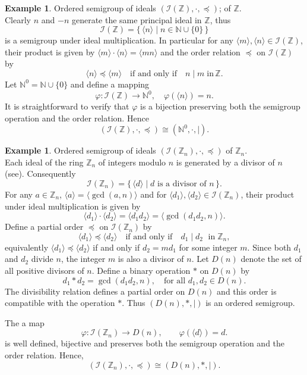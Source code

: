 \documentclass[12pt,a4paper]{amsart}
\theoremstyle{plain}
\theoremstyle{definition}
\newtheorem{example}[theorem]{Example}
\begin{document}
\begin{example} Ordered semigroup of ideals  $(\mathcal{I}(\mathbb{Z}), \cdot , \preccurlyeq)$; of $\mathbb{Z}$.\\
	Clearly $n$ and $-n$ generate the same principal ideal in $\mathbb{Z}$, thus 
	\[
	\mathcal{I}(\mathbb{Z}) = \{\, \langle n \rangle \mid n \in \mathbb{N} \cup \{0\} \,\}
	\]
	is a semigroup under ideal multiplication.
	In particular for any $\langle m \rangle, \langle n \rangle \in \mathcal{I}(\mathbb{Z})$,
	their product is given by
$	\langle m \rangle \cdot \langle n \rangle = \langle mn \rangle$
	and the order relation $\preccurlyeq$ on $\mathcal{I}(\mathbb{Z})$ by
	\[
	\langle n \rangle \preccurlyeq \langle m \rangle
	\quad \text{if and only if} \quad n \mid m \; \text{in}\, \mathbb{Z}.
	\]
	Let $\mathbb{N}^{0} = \mathbb{N} \cup \{0\}$ and define a mapping
	\[
	\varphi : \mathcal{I}(\mathbb{Z}) \longrightarrow \mathbb{N}^{0},
	\quad 	\varphi(\langle n \rangle) = n.
	\]
	It is straightforward to verify that $\varphi$ is a bijection preserving
	both the semigroup operation and the order relation.
	Hence
	\[
	(\mathcal{I}(\mathbb{Z}), \cdot , \preccurlyeq)
	\cong
	(\mathbb{N}^{0}, \cdot , \mid).
	\]
\end{example}
\begin{example} Ordered semigroup of ideals $(\mathcal{I}(\mathbb{Z}_{n}), \cdot , \preccurlyeq)$ of $\mathbb{Z}_{n}$.\\
	Each  ideal of the ring $\mathbb{Z}_n$ of integers modulo $n$  is generated by a divisor of $n$ (see\cite{punin}). Consequently
	\[
	\mathcal{I}(\mathbb{Z}_n)
	=
	\{\, \langle d \rangle \mid d \text{ is a  divisor of } n \,\}.
	\]
	For any $a \in \mathbb{Z}_n$, $	\langle a \rangle = \langle \gcd(a,n) \rangle $ and for 
	$\langle d_1 \rangle, \langle d_2 \rangle \in \mathcal{I}(\mathbb{Z}_n)$, their product under ideal multiplication is given by
	\[
	\langle d_1 \rangle \cdot \langle d_2 \rangle
	= \langle d_1 d_2 \rangle
	= \langle \gcd(d_1 d_2, n) \rangle.
	\]
	Define a partial order $\preccurlyeq$ on $\mathcal{I}(\mathbb{Z}_n)$ by
	\[
	\langle d_1 \rangle \preccurlyeq \langle d_2 \rangle
	\quad \text{if and only if} \quad
	d_1 \mid d_2 \; \text{ in}\; \mathbb{Z}_n,
	\]
	equivalently $\langle d_1 \rangle \preccurlyeq \langle d_2 \rangle$ if and only if
	$d_2 = m d_1$ for some integer $m$. Since both $d_1$ and $d_2$ divide $n$, the
	integer $m$ is also a divisor of $n$.
	Let $D(n)$ denote the set of all positive divisors of $n$.
	Define a binary operation $*$ on $D(n)$ by
	\[
	d_1 * d_2 = \gcd(d_1 d_2, n),
	\quad \text{for all } d_1, d_2 \in D(n).
	\]
	The divisibility relation defines a partial order on $D(n)$ and this order is compatible with the operation $*$. Thus $(D(n), *, \mid)$ is an ordered semigroup.
	
	The a map
	\[
	\varphi : \mathcal{I}(\mathbb{Z}_n) \longrightarrow D(n),
	\qquad
	\varphi(\langle d \rangle) = d.
	\]
	is well defined, bijective and preserves both the semigroup operation
	and the order relation.
	Hence,
	\[
	(\mathcal{I}(\mathbb{Z}_n), \cdot , \preccurlyeq)
	\cong
	(D(n), *, \mid).
	\]

\end{example}
\end{document}
